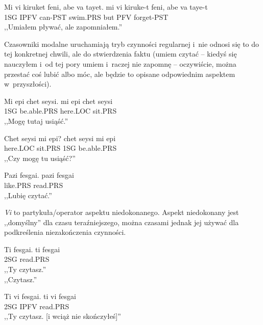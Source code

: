 \begin{spacing}{1.1}
\begin{exe}
	\ex
	\trans Mi vi kiruket feni, abe va tayet.
	\gll  mi vi kiruke-t feni, abe va taye-t\\
	  1SG IPFV can-PST swim.PRS but PFV forget-PST \\
	\glt  ,,Umiałem pływać, ale zapomniałem.''
\end{exe}

Czasowniki modalne uruchamiają tryb czynności regularnej i~nie odnosi się to do
tej konkretnej chwili, ale do stwierdzenia faktu (umiem czytać -- kiedyś się
nauczyłem i~od tej pory umiem i~raczej nie zapomnę -- oczywiście, można przestać
coś lubić albo móc, ale będzie to opisane odpowiednim aspektem w~przyszłości).

\begin{exe}
	\ex
	\trans Mi epi chet seysi.
	\gll  mi epi chet seysi\\
	  1SG be.able.PRS here.LOC sit.PRS \\
	\glt  ,,Mogę tutaj usiąść.''
\end{exe}

\begin{exe}
	\ex
	\trans Chet seysi mi epi?
	\gll  chet seysi mi epi\\
	  here.LOC sit.PRS 1SG be.able.PRS \\
	\glt  ,,Czy mogę tu usiąść?''
\end{exe}

\begin{exe}
	\ex
	\trans Pazi fesgai.
	\gll  pazi fesgai\\
	  like.PRS read.PRS \\
	\glt  ,,Lubię czytać.''
\end{exe}

\emph{Vi} to partykuła/operator aspektu niedokonanego. Aspekt niedokonany jest
,,domyślny'' dla czasu teraźniejszego, można czasami jednak jej używać dla
podkreślenia niezakończenia czynności.

\begin{exe}
	\ex
	\trans Ti fesgai.
	\gll  ti fesgai\\
	  2SG read.PRS \\
	\glt  ,,Ty czytasz.'' \\ ,,Czytasz.''
\end{exe}

\begin{exe}
	\ex
	\trans Ti vi fesgai.
	\gll  ti vi fesgai\\
	  2SG IPFV read.PRS \\
	\glt  ,,Ty czytasz. [i wciąż nie skończyłeś]''
\end{exe}


\end{spacing}
